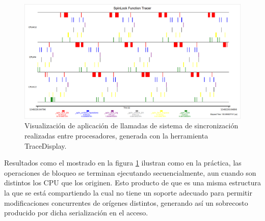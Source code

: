 \begin{figure}[!h]
	\centering
	\includegraphics[scale=0.34]{imagenes/traceVisualization.png}
	\caption{Visualización de aplicación de llamadas de sistema de sincronización realizadas entre procesadores, generada con la herramienta TraceDisplay.}
	\label{fig:traceDisplay}
\end{figure}

Resultados como el mostrado en la figura \ref{fig:traceDisplay} ilustran como en la práctica, las operaciones de bloqueo se terminan ejecutando secuencialmente, aun cuando son distintos los CPU que los originen. Esto producto de que es una misma estructura la que se está compartiendo la cual no tiene un soporte adecuado para permitir modificaciones concurrentes de orígenes distintos, generando así un sobrecosto producido por dicha serialización en el acceso.


